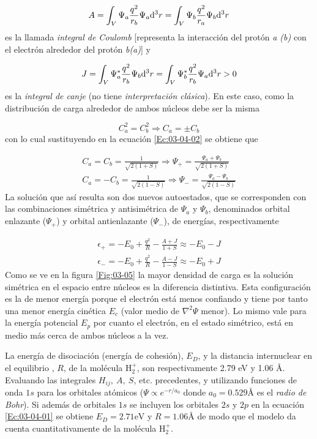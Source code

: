 \begin{equation*}
    A = \int_V \Psi_a \frac{q^2}{r_b} \Psi_a \mathrm{d}^3 r  = \int_V \Psi_b \frac{q^2}{r_a} \Psi_b \mathrm{d}^3 r
\end{equation*}
es la llamada \textit{integral de Coulomb} [representa la interacción del protón \textit{a (b)} con el electrón alrededor del protón \textit{b(a)}] y

\begin{equation*}
    J = \int_V \Psi_a^* \frac{q^2}{r_b} \Psi_b \mathrm{d}^3 r = \int_V \Psi_b^* \frac{q^2}{r_b} \Psi_a \mathrm{d}^3 r > 0
\end{equation*}
es la \textit{integral de canje} (no tiene \textit{interpretación clásica}). En este caso, como la distribución de carga alrededor de ambos núcleos debe ser la misma

\begin{equation*}
    C_a^2 = C_b^2 \Rightarrow C_a = \pm C_b
\end{equation*}
con lo cual sustituyendo en la ecuación \ref{Ec:03-04-02} se obtiene que

\begin{align}
    C_a = C_b = \frac{1}{\sqrt{2(1+S)}} \Rightarrow \Psi_+ = \frac{\Psi_a+\Psi_b}{\sqrt{2(1+S)}} \\
    C_a = -  C_b = \frac{1}{\sqrt{2(1-S)}} \Rightarrow \Psi_- = \frac{\Psi_a-\Psi_b}{\sqrt{2(1-S)}} 
\end{align}
La solución que así resulta son dos nuevos autoestados, que se corresponden con las combinaciones simétrica y antisimétrica de $\Psi_a$ y $\Psi_b$, denominados orbital enlazante ($\Psi_+$) y orbital antienlazante ($\Psi_-$), de energías, respectivamente 

\begin{align}
\epsilon_+ = - E_0 + \frac{q^2}{R} - \frac{A+J}{1+S} \approx - E_0 -J \\
\epsilon_- = - E_0 + \frac{q^2}{R} - \frac{A-J}{1-S} \approx - E_0 +J
\end{align}
Como se ve en la figura \ref{Fig:03-05} la mayor densidad de carga es la solución simétrica en el espacio entre núcleos es la diferencia distintiva. Esta configuración es la de menor energía porque el electrón está menos confiando y tiene por tanto una menor energía cinética $E_c$ (valor medio de $\nabla^2 \Psi$ menor). Lo mismo vale para la energía potencial $E_p$ por cuanto el electrón, en el estado simétrico, está en medio más cerca de ambos núcleos a la vez.


La energía de disociación (energía de cohesión), $E_D$, y la distancia internuclear en el equilibrio , $R$, de la molécula H$_2^+$, son respectivamente 2.79 eV y 1.06  \unit{\angstrom}. Evaluando las integrales $H_{ij}, \ A, \ S$, etc. precedentes, y utilizando funciones de onda $1s$ para los orbitales atómicos ($\Psi \propto e^{-r/a_0}$ donde $a_0=0.529\unit{\angstrom}$ es el \textit{radio de Bohr}). Si además de orbitales $1s$ se incluyen los orbitales $2s$ y $2p$ en la ecuación \ref{Ec:03-04-01} se obtiene $E_D = 2.71 \unit{\eV} $ y $R=1.06 \unit{\angstrom}$ de modo que el modelo da cuenta cuantitativamente de la molécula H$_2^+$.


